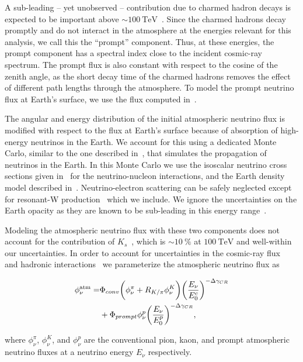 A sub-leading -- yet unobserved -- contribution due to charmed hadron decays is expected to be important above $\sim\SI{100}\TeV$~\cite{Bhattacharya:2015jpa}.
Since the charmed hadrons decay promptly and do not interact in the atmosphere at the energies relevant for this analysis, we call this the ``prompt'' component.
Thus, at these energies, the prompt component has a spectral index close to the incident cosmic-ray spectrum.
The prompt flux is also constant with respect to the cosine of the zenith angle, as the short decay time of the charmed hadrons removes the effect of different path lengths through the atmosphere.
To model the prompt neutrino flux at Earth's surface, we use the flux computed in~\cite{Bhattacharya:2015jpa}.

The angular and energy distribution of the initial atmospheric neutrino flux is modified with respect to the flux at Earth's surface because of absorption of high-energy neutrinos in the Earth.
We account for this using a dedicated Monte Carlo, similar to the one described in~\cite{Gazizov:2004va}, that simulates the propagation of neutrinos in the Earth.
In this Monte Carlo we use the isoscalar neutrino cross sections given in~\cite{CooperSarkar:2011pa} for the neutrino-nucleon interactions, and the Earth density model described in~\cite{Dziewonski:1981xy}.
Neutrino-electron scattering can be safely neglected except for resonant-W production~\cite{Glashow:1960zz} which we include.
We ignore the uncertainties on the Earth opacity as they are known to be sub-leading in this energy range~\cite{Gandhi:1995tf,CooperSarkar:2011pa,Vincent:2017svp}.

Modeling the atmospheric neutrino flux with these two components does not account for the contribution of $K_s$~\cite{Gaisser:2014pda}, which is $\sim \SI{10}\percent$ at $\SI{100}\TeV$ and well-within our uncertainties.
In order to account for uncertainties in the cosmic-ray flux~\cite{Dembinski:2017zsh} and hadronic interactions~\cite{Fedynitch:2012fs} we parameterize the atmospheric neutrino flux as
\noindent
\begin{linenomath*}
	\begin{equation}
	\begin{split}
	\phi_\nu^{\rm{atm}} =& \Phi_{conv} \bigg(\phi^\pi_\nu + R_{K/\pi} \phi^K_\nu\bigg) {\bigg(\frac{E_\nu}{E_0^c} \bigg)}^{-\Delta \gamma_{CR}} \\ &+ \Phi_{prompt} \phi^p_\nu {\bigg(\frac{E_\nu}{E_0^p} \bigg)}^{-\Delta \gamma_{CR}},
	\end{split}
	\label{eq:atm_flux_equation}
	\end{equation}
\end{linenomath*}
where $\phi^\pi_\nu$, $\phi^K_\nu$, and $\phi^p_\nu$ are the conventional pion, kaon, and prompt atmospheric neutrino fluxes at a neutrino energy $E_\nu$ respectively.

